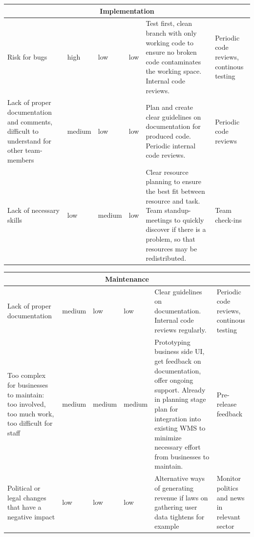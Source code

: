 \documentclass[titlepage]{article}
\begin{document}
\begin{center}
 \begin{tabular}{|p{3cm}|p{2cm}|p{2cm}|p{2cm}|p{2cm}|p{2cm}|}
 \hline
 \multicolumn{6}{|c|}{Implementation} \\
 \hline
 Risk for bugs & high & low & low & Test first, clean branch with only working code to ensure no broken code contaminates the working space. Internal code reviews. & Periodic code reviews, continous testing \\
 \hline
 Lack of proper documentation and comments, difficult to understand for other team-members & medium & low & low & Plan and create clear guidelines on documentation for produced code. Periodic internal code reviews. & Periodic code reviews \\
 \hline
 Lack of necessary skills & low & medium & low & Clear resource planning to ensure the best fit between resource and task. Team standup-meetings to quickly discover if there is a problem, so that resources may be redistributed. & Team check-ins \\
 \hline
 \end{tabular}
 \end{center}

 \begin{center}
 \begin{tabular}{|p{3cm}|p{2cm}|p{2cm}|p{2cm}|p{2cm}|p{2cm}|}
 \hline
 \multicolumn{6}{|c|}{Maintenance} \\
 \hline
 Lack of proper documentation & medium & low & low & Clear guidelines on documentation. Internal code reviews regularly. & Periodic code reviews, continous testing \\
 \hline
 Too complex for businesses to maintain: too involved, too much work, too difficult for staff & medium & medium & medium & Prototyping business side UI, get feedback on documentation, offer ongoing support. Already in planning stage plan for integration into existing WMS to minimize necessary effort from businesses to maintain. & Pre-release feedback \\
 \hline
 Political or legal changes that have a negative impact & low & low & low & Alternative ways of generating revenue if laws on gathering user data tightens for example & Monitor politics and news in relevant sector \\
 \hline
 \end{tabular}
 \end{center}
\end{document}
